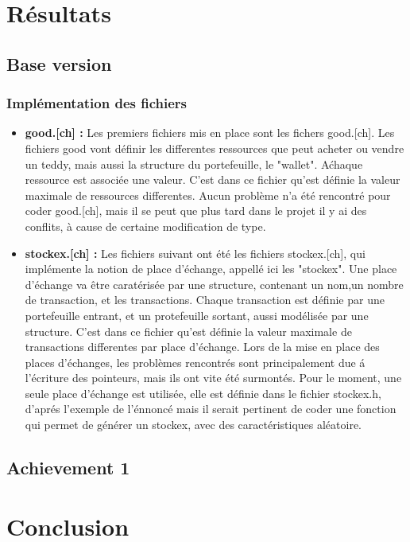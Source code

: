 \documentclass{article}
\begin{document}
\section{R\'esultats}

\subsection{Base version} 

\subsubsection{Impl\'ementation des fichiers}

\begin{itemize}

\item\textbf{good.[ch] :} Les premiers fichiers mis en place sont les fichers good.[ch].
Les fichiers good vont d\'efinir les differentes ressources que peut acheter ou vendre un teddy, mais aussi la structure du portefeuille, le "wallet". 
A\' chaque ressource est associée une valeur.
C'est dans ce fichier qu'est d\'efinie la valeur maximale de ressources differentes.
Aucun probl\`eme n'a \'et\'e rencontr\'e pour coder good.[ch], mais il se peut que plus tard dans le projet il y ai des conflits, \`a cause de certaine modification de type. 

\item\textbf{stockex.[ch] :}  Les fichiers suivant ont \'et\'e les fichiers stockex.[ch], qui impl\'emente la notion de place d'\'echange, appell\'e ici les "stockex".
Une place d'\'echange va \^etre carat\'eris\'ee par une structure, contenant un nom,un nombre de transaction, et les transactions. 
Chaque transaction est d\'efinie par une portefeuille entrant, et un protefeuille sortant, aussi mod\'elis\'ee par une structure.
C'est dans ce fichier qu'est d\'efinie la valeur maximale de transactions differentes par place d'\'echange.
Lors de la mise en place des places d'\'echanges, les probl\`emes rencontr\'es sont principalement due \'a l'écriture des pointeurs, mais ils ont vite \'et\'e surmont\'es.
Pour le moment, une seule place d'\'echange est utilis\'ee, elle est d\'efinie dans le fichier stockex.h, d'apr\'es l'exemple de l'\'ennonc\'e mais il serait pertinent de coder une fonction qui permet de g\'en\'erer un stockex, avec des caract\'eristiques al\'eatoire.

\end{itemize}

\subsection{Achievement 1}

\section{Conclusion}
\end{document}

